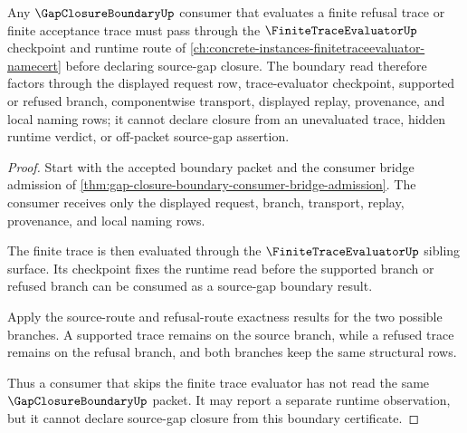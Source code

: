 \begin{theorem}
\label{thm:gap-closure-boundary-finite-trace-evaluator-route}
Any $\GapClosureBoundaryUp$ consumer that evaluates a finite refusal trace or finite acceptance trace must pass through the $\FiniteTraceEvaluatorUp$ checkpoint and runtime route of \autoref{ch:concrete-instances-finitetraceevaluator-namecert} before declaring source-gap closure. The boundary read therefore factors through the displayed request row, trace-evaluator checkpoint, supported or refused branch, componentwise transport, displayed replay, provenance, and local naming rows; it cannot declare closure from an unevaluated trace, hidden runtime verdict, or off-packet source-gap assertion.
\end{theorem}
\begin{proof}
Start with the accepted boundary packet and the consumer bridge admission of \autoref{thm:gap-closure-boundary-consumer-bridge-admission}. The consumer receives only the displayed request, branch, transport, replay, provenance, and local naming rows.

The finite trace is then evaluated through the $\FiniteTraceEvaluatorUp$ sibling surface. Its checkpoint fixes the runtime read before the supported branch or refused branch can be consumed as a source-gap boundary result.

Apply the source-route and refusal-route exactness results for the two possible branches. A supported trace remains on the source branch, while a refused trace remains on the refusal branch, and both branches keep the same structural rows.

Thus a consumer that skips the finite trace evaluator has not read the same $\GapClosureBoundaryUp$ packet. It may report a separate runtime observation, but it cannot declare source-gap closure from this boundary certificate.
\end{proof}
